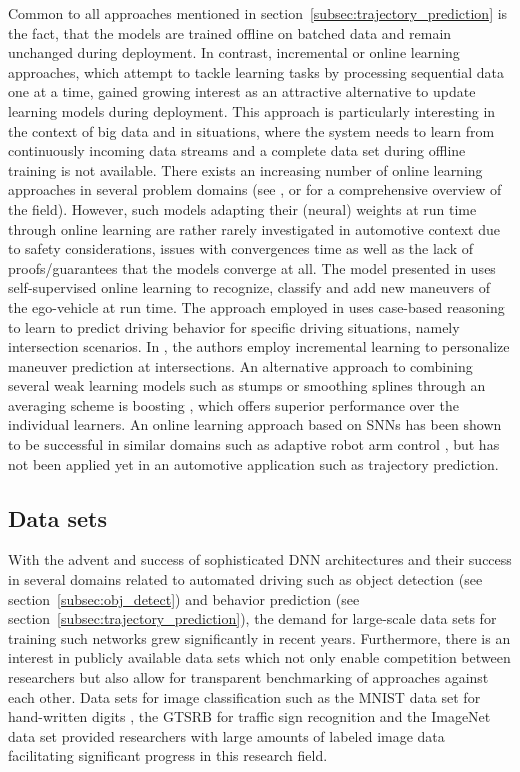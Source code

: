 Common to all approaches mentioned in section~\ref{subsec:trajectory_prediction} is the fact, that the models are trained offline on batched data and remain unchanged during deployment.
In contrast, incremental or online learning approaches, which attempt to tackle learning tasks by processing sequential data one at a time, gained growing interest as an attractive alternative to update learning models during deployment.
This approach is particularly interesting in the context of big data and in situations, where the system needs to learn from continuously incoming data streams and a complete data set during offline training is not available.
There exists an increasing number of online learning approaches in several problem domains (see \cite{Losing2018}, \cite{Gomes2017} or \cite{Hoi2018} for a comprehensive overview of the field).
However, such models adapting their (neural) weights at run time through online learning are rather rarely investigated in automotive context due to safety considerations, issues with convergences time as well as the lack of proofs/guarantees that the models converge at all.
The model presented in \cite{Maye2011} uses self-supervised online learning to recognize, classify and add new maneuvers of the ego-vehicle at run time.
The approach employed in \cite{Graf2014} uses case-based reasoning to learn to predict driving behavior for specific driving situations, namely intersection scenarios.
In \cite{Losing2017}, the authors employ incremental learning to personalize maneuver prediction at intersections.
An alternative approach to combining several weak learning models such as stumps or smoothing splines through an averaging scheme is boosting \cite{Taieb2014}, which offers superior performance over the individual learners.
An online learning approach based on \acp{SNN} has been shown to be successful in similar domains such as adaptive robot arm control \cite{DeWolf2016}, but has not been applied yet in an automotive application such as trajectory prediction.

\subsection{Data sets}%
\label{subsec:data_sets}

With the advent and success of sophisticated \ac{DNN} architectures and their success in several domains related to automated driving such as object detection (see section~\ref{subsec:obj_detect}) and behavior prediction (see section~\ref{subsec:trajectory_prediction}), the demand for large-scale data sets for training such networks grew significantly in recent years.
Furthermore, there is an interest in publicly available data sets which not only enable competition between researchers but also allow for transparent benchmarking of approaches against each other.
Data sets for image classification such as the \ac{MNIST} data set for hand-written digits \cite{LeCun1998} , the \ac{GTSRB} for traffic sign recognition \cite{Stallkamp2012} and the ImageNet data set \cite{Deng2009} provided researchers with large amounts of labeled image data facilitating significant progress in this research field.

